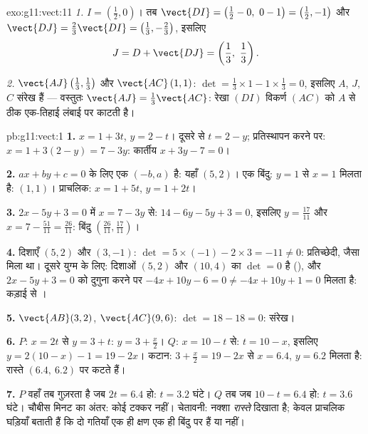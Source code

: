 \begin{solution}{exo:g11:vect:11}
\emph{1.} $I = \left(\frac12, 0\right)$। तब
$\vect{DI} = \left(\frac12 - 0,\ 0 - 1\right) = \left(\frac12, -1\right)$
और $\vect{DJ} = \frac23\vect{DI} = \left(\frac13, -\frac23\right)$, इसलिए
\[
J = D + \vect{DJ} = \left(\frac13,\ \frac13\right).
\]

\emph{2.} $\vect{AJ}\left(\frac13, \frac13\right)$ और $\vect{AC}\,(1, 1)$: $\det = \frac13 \times 1 - 1 \times \frac13 = 0$, इसलिए $A$, $J$, $C$ संरेख हैं ---
वस्तुतः $\vect{AJ} = \frac13\vect{AC}$: रेखा $(DI)$ विकर्ण $(AC)$ को $A$ से ठीक एक-तिहाई लंबाई पर
काटती है।
\end{solution}

\begin{solution}{pb:g11:vect:1}
\textbf{1.} $x = 1 + 3t$, $y = 2 - t$। दूसरे से $t = 2 - y$; प्रतिस्थापन करने पर: $x = 1 + 3(2 - y) = 7 - 3y$:
कार्तीय  $x + 3y - 7 = 0$।

\textbf{2.} $ax + by + c = 0$ के लिए एक  $(-b, a)$ है: यहाँ $(5, 2)$। एक बिंदु: $y = 1$
से $x = 1$ मिलता है: $(1, 1)$। प्राचलिक: $x = 1 + 5t$, $y = 1 + 2t$।

\textbf{3.} $2x - 5y + 3 = 0$ में $x = 7 - 3y$ से: $14 - 6y - 5y + 3 = 0$, इसलिए $y = \frac{17}{11}$ और $x = 7 - \frac{51}{11} = \frac{26}{11}$: बिंदु $\left(\frac{26}{11}, \frac{17}{11}\right)$।

\textbf{4.} दिशाएँ $(5, 2)$ और $(3, -1)$: $\det = 5 \times (-1) - 2 \times 3 = -11 \neq 0$: प्रतिच्छेदी, जैसा मिला था। दूसरे
युग्म के लिए: दिशाओं $(5, 2)$ और $(10, 4)$ का $\det = 0$ है (), और $2x - 5y + 3 = 0$ को दुगुना
करने पर $-4x + 10y - 6 = 0 \neq -4x + 10y + 1
= 0$ मिलता है: कड़ाई से ।

\textbf{5.} $\vect{AB}(3, 2)$, $\vect{AC}(9, 6)$: $\det = 18 - 18 = 0$: संरेख।

\textbf{6.} $P$: $x = 2t$ से $y = 3 + t$: $y = 3 +
\frac x2$। $Q$: $x = 10 - t$ से: $t = 10 - x$, इसलिए
$y = 2(10 - x) - 1 = 19 - 2x$। कटान: $3 + \frac x2 = 19 - 2x$ से $x = 6.4$, $y = 6.2$ मिलता है: रास्ते $(6.4,\ 6.2)$ पर कटते हैं।

\textbf{7.} $P$ वहाँ तब गुज़रता है जब $2t = 6.4$ हो: $t = 3.2$ घंटे। $Q$ तब जब
$10 - t = 6.4$ हो: $t = 3.6$ घंटे। चौबीस मिनट का अंतर: कोई टक्कर नहीं। चेतावनी: नक्शा
\emph{रास्ते} दिखाता है; केवल प्राचलिक घड़ियाँ बताती हैं कि दो गतियाँ एक ही
क्षण एक ही बिंदु पर हैं या नहीं।


\end{solution}
